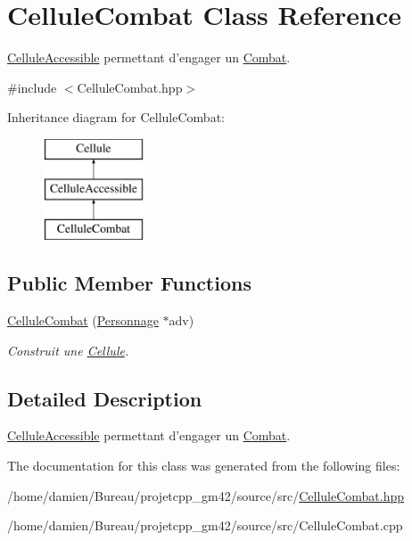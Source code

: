 \hypertarget{classCelluleCombat}{\section{Cellule\-Combat Class Reference}
\label{classCelluleCombat}
}


\hyperlink{classCelluleAccessible}{Cellule\-Accessible} permettant d'engager un \hyperlink{classCombat}{Combat}.  




{\ttfamily \#include $<$Cellule\-Combat.\-hpp$>$}

Inheritance diagram for Cellule\-Combat\-:\begin{figure}[H]
\begin{center}
\leavevmode
\includegraphics[height=3.000000cm]{classCelluleCombat}
\end{center}
\end{figure}
\subsection*{Public Member Functions}
\begin{DoxyCompactItemize}
\item 
\hypertarget{classCelluleCombat_a53dd066618a86b4986ae54ff49d64b3d}{\hyperlink{classCelluleCombat_a53dd066618a86b4986ae54ff49d64b3d}{Cellule\-Combat} (\hyperlink{classPersonnage}{Personnage} $\ast$adv)}\label{classCelluleCombat_a53dd066618a86b4986ae54ff49d64b3d}

\begin{DoxyCompactList}\small\item\em Construit une \hyperlink{classCellule}{Cellule}. \end{DoxyCompactList}\end{DoxyCompactItemize}


\subsection{Detailed Description}
\hyperlink{classCelluleAccessible}{Cellule\-Accessible} permettant d'engager un \hyperlink{classCombat}{Combat}. 

The documentation for this class was generated from the following files\-:\begin{DoxyCompactItemize}
\item 
/home/damien/\-Bureau/projetcpp\-\_\-gm42/source/src/\hyperlink{CelluleCombat_8hpp}{Cellule\-Combat.\-hpp}\item 
/home/damien/\-Bureau/projetcpp\-\_\-gm42/source/src/Cellule\-Combat.\-cpp\end{DoxyCompactItemize}
